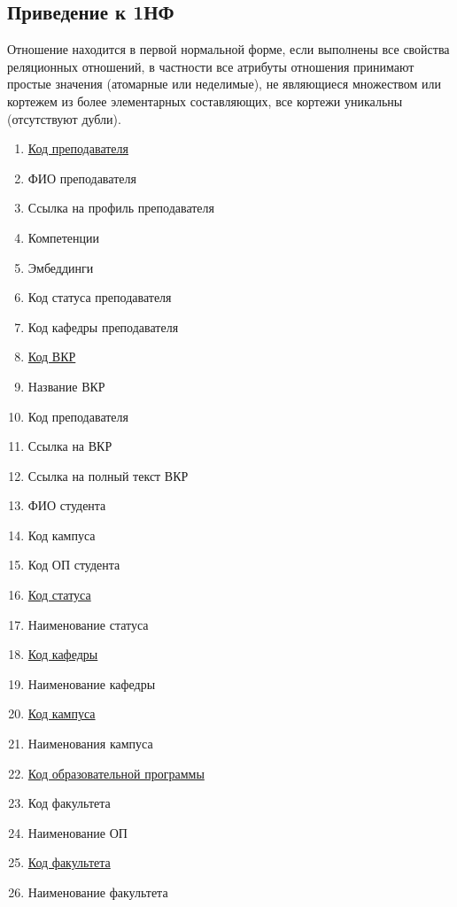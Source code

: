 \documentclass[PI,KR]{HSEUniversity}
\begin{document}
\subsection{Приведение к 1НФ}
Отношение находится в первой нормальной форме, если выполнены все свойства реляционных отношений, в частности все атрибуты отношения принимают простые значения (атомарные или неделимые), не являющиеся множеством или кортежем из более элементарных составляющих, все кортежи уникальны (отсутствуют дубли).
\begin{enumerate}
	\item \underline{Код преподавателя}
	\item ФИО преподавателя
	\item Ссылка на профиль преподавателя
	\item Компетенции
	\item Эмбеддинги
	\item Код статуса преподавателя
	\item Код кафедры преподавателя
		
	\item \underline{Код ВКР}
	\item Название ВКР
	\item Код преподавателя
	\item Ссылка на ВКР
	\item Ссылка на полный текст ВКР
	\item ФИО студента
	\item Код кампуса
	\item Код ОП студента
	
	\item \underline{Код статуса}
	\item Наименование статуса
	
	\item \underline{Код кафедры}
	\item Наименование кафедры
	
	\item \underline{Код кампуса}
	\item Наименования кампуса
	
	\item \underline{Код образовательной программы}
	\item Код факультета
	\item Наименование ОП
	
	\item \underline{Код факультета}
	\item Наименование факультета
\end{enumerate} 
\end{document}
